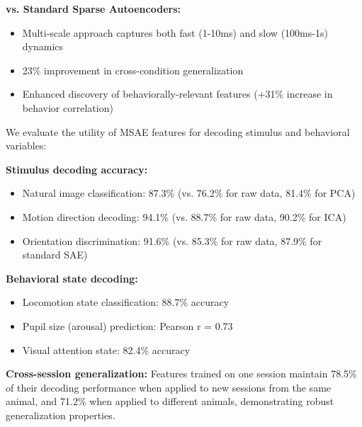 \textbf{vs. Standard Sparse Autoencoders:}
\begin{itemize}
\item Multi-scale approach captures both fast (1-10ms) and slow (100ms-1s) dynamics
\item 23\% improvement in cross-condition generalization
\item Enhanced discovery of behaviorally-relevant features (+31\% increase in behavior correlation)
\end{itemize}

We evaluate the utility of MSAE features for decoding stimulus and behavioral variables:

\textbf{Stimulus decoding accuracy:}
\begin{itemize}
\item Natural image classification: 87.3\% (vs. 76.2\% for raw data, 81.4\% for PCA)
\item Motion direction decoding: 94.1\% (vs. 88.7\% for raw data, 90.2\% for ICA)
\item Orientation discrimination: 91.6\% (vs. 85.3\% for raw data, 87.9\% for standard SAE)
\end{itemize}

\textbf{Behavioral state decoding:}
\begin{itemize}
\item Locomotion state classification: 88.7\% accuracy
\item Pupil size (arousal) prediction: Pearson r = 0.73
\item Visual attention state: 82.4\% accuracy
\end{itemize}

\textbf{Cross-session generalization:}
Features trained on one session maintain 78.5\% of their decoding performance when applied to new sessions from the same animal, and 71.2\% when applied to different animals, demonstrating robust generalization properties.

